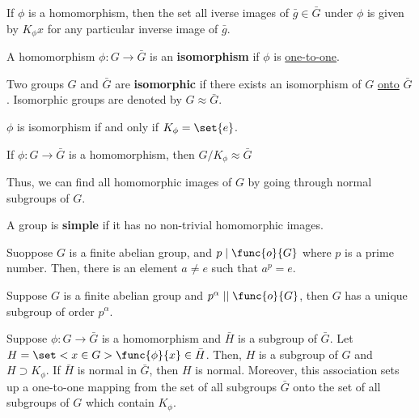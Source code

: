 \begin{lemma}
    If \(\phi\) is a homomorphism, then the set all iverse images of \(\bar{g} \in \bar{G}\) under \(\phi\) is given by \(K_{\phi} x\) for any particular inverse image of \(\bar{g}\).
\end{lemma}

\begin{definition}
    A homomorphism \(\phi: G \to \bar{G}\) is an \textbf{isomorphism} if \(\phi\) is \underline{one-to-one}.
\end{definition}

\begin{definition}
    Two groups \(G\) and \(\bar{G}\) are \textbf{isomorphic} if there exists an isomorphism of \(G\) \underline{onto} \(\bar{G}\). Isomorphic groups are denoted by \(G \approx \bar{G}\).
\end{definition}

\begin{corollary}
    \(\phi\) is isomorphism if and only if \(K_{\phi} = \set{e}\).
\end{corollary}

\begin{theorem}
    If \(\phi: G \to \bar{G}\) is a homomorphism, then \(G/K_{\phi} \approx \bar{G}\)
\end{theorem}

Thus, we can find all homomorphic images of \(G\) by going through normal subgroups of \(G\).

\begin{definition}
    A group is \textbf{simple} if it has no non-trivial homomorphic images.
\end{definition}

\begin{theorem}
    Suoppose \(G\) is a finite abelian group, and \(p \mid \func{o}{G}\) where \(p\) is a prime number. Then, there is an element \(a \neq e\) such that \(a^p = e\).
\end{theorem}

\begin{theorem}
    Suppose \(G\) is a finite abelian group and \(p^{\alpha} \mid\mid \func{o}{G}\), then \(G\) has a unique subgroup of order \(p^{\alpha}\).
\end{theorem}

\begin{lemma}
    Suppose \(\phi: G \to \bar{G}\) is a homomorphism and \(\bar{H}\) is a subgroup of \(\bar{G}\). Let \(H = \set<x \in G>{\func{\phi}{x} \in \bar{H}}\). Then, \(H\) is a subgroup of \(G\) and \(H \supset K_{\phi}\). If \(\bar{H}\) is normal in \(\bar{G}\), then \(H\) is normal. Moreover, this association sets up a one-to-one mapping from the set of all subgroups \(\bar{G}\) onto the set of all subgroups of \(G\) which contain \(K_{\phi}\).
\end{lemma}

